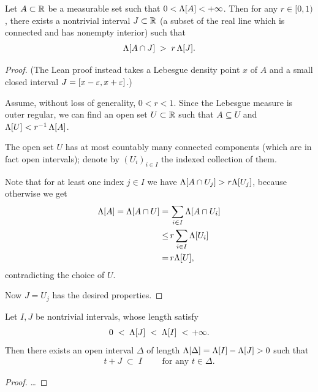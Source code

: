 \begin{lemma}
  \label{lem:exists-high-overlap-interval}
  \leanok
  Let $A \subset \mathbb{R}$ be a measurable set such that $0 < \Lambda[A] < +\infty$.
  Then for any $r \in [0,1)$, there exists a nontrivial interval $J \subset \mathbb{R}$
  (a subset of the real line which is connected and has nonempty interior)
  such that
  \begin{align*}
    \Lambda[A \cap J] \; > \; r \, \Lambda[J] .
  \end{align*}
\end{lemma}
\begin{proof}
  \leanok
  (The Lean proof instead takes a Lebesgue density point $x$ of $A$ and a small
  closed interval $J = [x-\varepsilon, x+\varepsilon]$.)

  Assume, without loss of generality, $0 < r < 1$.
  Since the Lebesgue measure is outer regular, we can find an open set $U \subset \mathbb{R}$
  such that $A \subseteq U$ and $\Lambda[U] < r^{-1} \, \Lambda[A]$.

  The open set $U$ has at most countably many connected components
  (which are in fact open intervals); denote
  by $(U_i)_{i \in I}$ the indexed collection of them.

  Note that for at least one index $j \in I$ we
  have $\Lambda[A \cap U_j] > r \Lambda[U_j]$,
  because otherwise we get
  \begin{align*}
    \Lambda[A] = \Lambda[A \cap U]
    = \, & \sum_{i \in I} \Lambda[A \cap U_i] \\
    \le \, & r \sum_{i \in I} \Lambda[U_i] \\
    = \, & r \Lambda[U],
  \end{align*}
  contradicting the choice of $U$.

  Now $J = U_j$ has the desired properties.
\end{proof}

\begin{lemma}
  \label{lem:shift-interval-contained-in-larger}
  Let $I, J$ be nontrivial intervals, whose length satisfy
  \begin{align*}
    0 \; < \; \Lambda[J] \; < \; \Lambda[I] \; < \, +\infty .
  \end{align*}
  Then there exists an open interval $\Delta$ of length
  $\Lambda[\Delta] = \Lambda[I] - \Lambda[J] > 0$ such that
  \begin{align*}
    t + J \; \subset \; I
    \qquad \text{ for any $t \in \Delta$.}
  \end{align*}
\end{lemma}
\begin{proof}
  \ldots
\end{proof}

